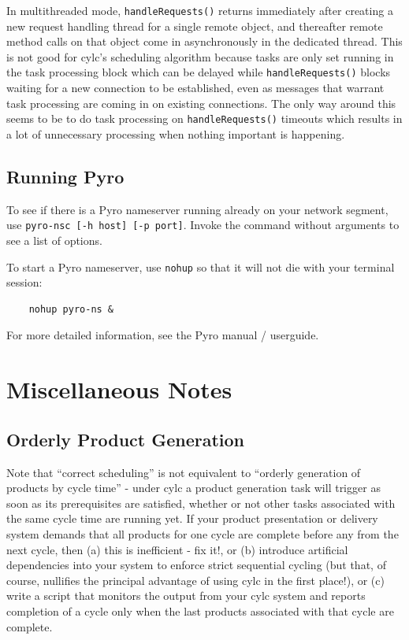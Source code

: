 \documentclass[11pt,a4paper]{article}
\begin{document}
In multithreaded mode, \lstinline=handleRequests()= returns immediately
after creating a new request handling thread for a single remote object,
and thereafter remote method calls on that object come in asynchronously
in the dedicated thread. This is not good for cylc's scheduling
algorithm because tasks are only set running in the task processing
block which can be delayed while \lstinline=handleRequests()= blocks waiting
for a new connection to be established, even as messages that warrant
task processing are coming in on existing connections. The only way
around this seems to be to do task processing on \lstinline=handleRequests()=
timeouts which results in a lot of unnecessary processing when nothing
important is happening.

\subsection{Running Pyro}
\label{RunningPyro}

To see if there is a Pyro nameserver running already on your network
segment, use \lstinline=pyro-nsc [-h host] [-p port]=. Invoke the
command without arguments to see a list of options.

To start a Pyro nameserver, use \lstinline{nohup} so that it
will not die with your terminal session: 

\begin{lstlisting}
    nohup pyro-ns &
\end{lstlisting}

For more detailed information, see the Pyro manual / userguide.

\pagebreak
\section{Miscellaneous Notes}
\label{MiscellaneousNotes}

\subsection{Orderly Product Generation}
\label{OrderlyProductGeneration}

Note that ``correct scheduling'' is not equivalent to ``orderly
generation of products by cycle time'' - under cylc a product
generation task will trigger as soon as its prerequisites are satisfied,
whether or not other tasks associated with the same cycle time are
running yet. If your product presentation or delivery system demands
that all products for one cycle are complete before any from the next
cycle, then (a) this is inefficient - fix it!, or (b) introduce artificial
dependencies into your system to enforce strict sequential cycling (but
that, of course, nullifies the principal advantage of using cylc in the
first place!), or (c) write a script that monitors the output from 
your cylc system and reports completion of a cycle only when the last
products associated with that cycle are complete. 
\end{document}
